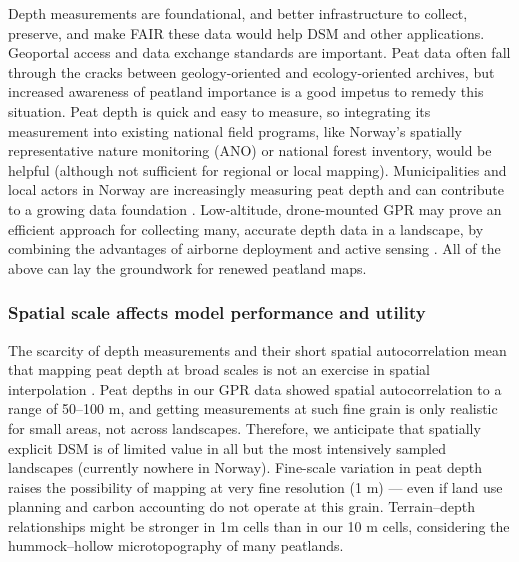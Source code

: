 \documentclass[soil, manuscript]{copernicus}
\begin{document}
Depth measurements are foundational, and better infrastructure to collect, preserve, and make FAIR these data would help DSM and other applications.
Geoportal access and data exchange standards \citeyearpar[like Natural England's for peat surveys,][]{naturalenglandDataExchangeStandard2023} are important.
Peat data often fall through the cracks between geology-oriented and ecology-oriented archives, but increased awareness of peatland importance is a good impetus to remedy this situation.
Peat depth is quick and easy to measure, so integrating its measurement into existing national field programs, like Norway's spatially representative nature monitoring (ANO) or national forest inventory, would be helpful (although not sufficient for regional or local mapping).
Municipalities and local actors in Norway are increasingly measuring peat depth and can contribute to a growing data foundation \citep{kyrkjeeideCalculatorLocalPeatland2023}.
Low-altitude, drone-mounted GPR may prove an efficient approach for collecting many, accurate depth data in a landscape, by combining the advantages of airborne deployment and active sensing \citep{pelletierPeatAnalysesHudson1991, ruolsDevelopmentDronebasedGroundpenetrating2023}.
All of the above can lay the groundwork for renewed peatland maps.

\subsubsection{Spatial scale affects model performance and utility}

The scarcity of depth measurements and their short spatial autocorrelation mean that mapping peat depth at broad scales is not an exercise in spatial interpolation \citep{henglGenericFrameworkSpatial2004}.
Peat depths in our GPR data showed spatial autocorrelation to a range of 50--100 m, and getting measurements at such fine grain is only realistic for small areas, not across landscapes.
Therefore, we anticipate that spatially explicit DSM is of limited value in all but the most intensively sampled landscapes (currently nowhere in Norway).
Fine-scale variation in peat depth raises the possibility of mapping at very fine resolution (1 m) --- even if land use planning and carbon accounting do not operate at this grain.
Terrain--depth relationships might be stronger in 1m cells than in our 10 m cells, considering the hummock--hollow microtopography of many peatlands.
\end{document}
